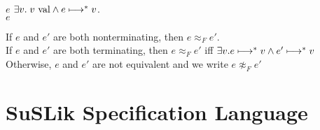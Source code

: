 \documentclass[10pt]{article}
\begin{document}
\begin{definition}[Termination]
  $e$  $\exists v.\; v \textnormal{ val} \land e \longmapsto^{*} v$.\\
  $e$ 
\end{definition}

\begin{definition}
  If $e$ and $e'$ are both nonterminating, then $e \approx_F e'$.\\
  If $e$ and $e'$ are both terminating, then $e \approx_F e'$ iff $\exists v. e \longmapsto^{*} v \land e' \longmapsto^{*} v$\\
  Otherwise, $e$ and $e'$ are not equivalent and we write $e \not\approx_F e'$
\end{definition}

\section{SuSLik Specification Language}
\label{sec:SuSLikDef}
\end{document}

